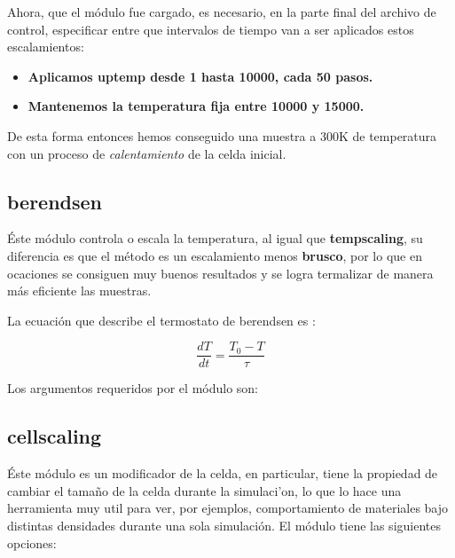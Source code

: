 Ahora, que el m\'odulo fue cargado, es necesario, en la parte final del archivo de control, especificar entre que intervalos de tiempo van a ser aplicados estos escalamientos:

\begin{itemize}
 \item \textbf{Aplicamos \textbf{uptemp} desde 1 hasta 10000, cada 50 pasos.}
 \item \textbf{Mantenemos la temperatura fija entre 10000 y 15000.}
\end{itemize}

De esta forma entonces hemos conseguido una muestra a 300K de temperatura con un proceso de \textit{calentamiento} de la celda inicial.

\subsection{berendsen}
\'Este m\'odulo controla o escala la temperatura, al igual que \textbf{tempscaling}, su diferencia es que el m\'etodo es un escalamiento menos \textbf{brusco}, por lo que en ocaciones se consiguen muy buenos resultados y se logra termalizar de manera m\'as eficiente las muestras. 

La ecuaci\'on que describe el termostato de berendsen es :

$$\frac{dT}{dt} = \frac{T_0 - T}{\tau}$$

Los argumentos requeridos por el m\'odulo son:



\subsection{cellscaling}
\'Este m\'odulo es un modificador de la celda, en particular, tiene la propiedad de cambiar el tama\~no de la celda durante la simulaci'on, lo que lo hace una herramienta muy util para ver, por ejemplos, comportamiento de materiales bajo distintas densidades durante una sola simulaci\'on. El m\'odulo tiene las siguientes opciones:

